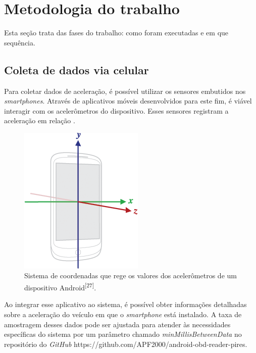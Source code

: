 \chapter{Metodologia do trabalho}
\label{CAP3}

Esta seção trata das fases do trabalho: como foram  executadas e em que sequência.



\section{Coleta de dados via celular}
Para coletar dados de aceleração, é possível utilizar os sensores embutidos nos \textit{smartphones}. Através de aplicativos móveis desenvolvidos para este fim, é viável interagir com os acelerômetros do dispositivo. Esses sensores registram a aceleração em relação . 


\begin{figure}[hp]
    \centering
    
    \includegraphics[]{figures/axis_android_device.png}
    
    \caption{Sistema de coordenadas que rege os valores dos acelerômetros de um dispositivo Android\textsuperscript{[27]}.}
    
    \label{fig:axis_android}
\end{figure}

Ao integrar esse aplicativo ao sistema, é possível obter informações detalhadas sobre a aceleração do veículo em que o \textit{smartphone} está instalado. A taxa de amostragem desses dados pode ser ajustada para atender às necessidades específicas do sistema por um parâmetro chamado \textit{minMillisBetweenData} no repositório do \textit{GitHub} https://github.com/APF2000/android-obd-reader-pires. 

